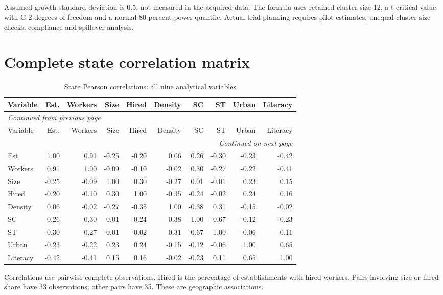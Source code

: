 \documentclass[11pt,a4paper]{report}
\begin{document}
Assumed growth standard deviation is 0.5, not measured in the acquired data. The formula uses retained cluster size 12, a t critical value with G-2 degrees of freedom and a normal 80-percent-power quantile. Actual trial planning requires pilot estimates, unequal cluster-size checks, compliance and spillover analysis.
\section{Complete state correlation matrix}
\begingroup\footnotesize\setlength{\tabcolsep}{4pt}
\begin{longtable}{lrrrrrrrrr}
\caption{State Pearson correlations: all nine analytical variables}\\\toprule
Variable & Est. & Workers & Size & Hired & Density & SC & ST & Urban & Literacy \\\midrule\endfirsthead
\multicolumn{10}{l}{\textit{Continued from previous page}}\\\toprule
Variable & Est. & Workers & Size & Hired & Density & SC & ST & Urban & Literacy \\\midrule\endhead
\midrule\multicolumn{10}{r}{\textit{Continued on next page}}\\\endfoot\bottomrule\endlastfoot
Est. & 1.00 & 0.91 & -0.25 & -0.20 & 0.06 & 0.26 & -0.30 & -0.23 & -0.42 \\
Workers & 0.91 & 1.00 & -0.09 & -0.10 & -0.02 & 0.30 & -0.27 & -0.22 & -0.41 \\
Size & -0.25 & -0.09 & 1.00 & 0.30 & -0.27 & 0.01 & -0.01 & 0.23 & 0.15 \\
Hired & -0.20 & -0.10 & 0.30 & 1.00 & -0.35 & -0.24 & -0.02 & 0.24 & 0.16 \\
Density & 0.06 & -0.02 & -0.27 & -0.35 & 1.00 & -0.38 & 0.31 & -0.15 & -0.02 \\
SC & 0.26 & 0.30 & 0.01 & -0.24 & -0.38 & 1.00 & -0.67 & -0.12 & -0.23 \\
ST & -0.30 & -0.27 & -0.01 & -0.02 & 0.31 & -0.67 & 1.00 & -0.06 & 0.11 \\
Urban & -0.23 & -0.22 & 0.23 & 0.24 & -0.15 & -0.12 & -0.06 & 1.00 & 0.65 \\
Literacy & -0.42 & -0.41 & 0.15 & 0.16 & -0.02 & -0.23 & 0.11 & 0.65 & 1.00 \\
\end{longtable}\endgroup
Correlations use pairwise-complete observations. Hired is the percentage of establishments with hired workers. Pairs involving size or hired share have 33 observations; other pairs have 35. These are geographic associations.
\end{document}
